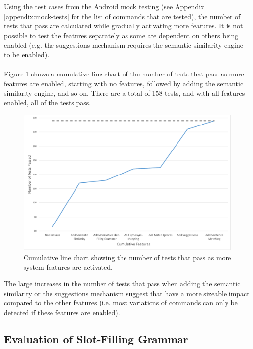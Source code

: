 \documentclass[11pt]{article}
\begin{document}
Using the test cases from the Android mock testing (see Appendix \ref{appendix:mock-tests} for the list of commands that are tested), the number of tests that pass are calculated while gradually activating more features. It is not possible to test the features separately as some are dependent on others being enabled (e.g. the suggestions mechanism requires the semantic similarity engine to be enabled).
\\
\\
Figure \ref{fig:line-chart-features} shows a cumulative line chart of the number of tests that pass as more features are enabled, starting with no features, followed by adding the semantic similarity engine, and so on. There are a total of 158 tests, and with all features enabled, all of the tests pass.


\begin{center}
\begin{figure}[H]
\begin{center}
  \includegraphics[width=\linewidth]{feature-evaluation.pdf}
  \caption{Cumulative line chart showing the number of tests that pass as more system features are activated.}
  \label{fig:line-chart-features}
  \end{center}
\end{figure}
\end{center}

The large increases in the number of tests that pass when adding the semantic similarity or the suggestions mechanism suggest that have a more sizeable impact compared to the other features (i.e. most variations of commands can only be detected if these features are enabled).

\subsection{Evaluation of Slot-Filling Grammar}
\label{section:eval-sfs}
\end{document}
